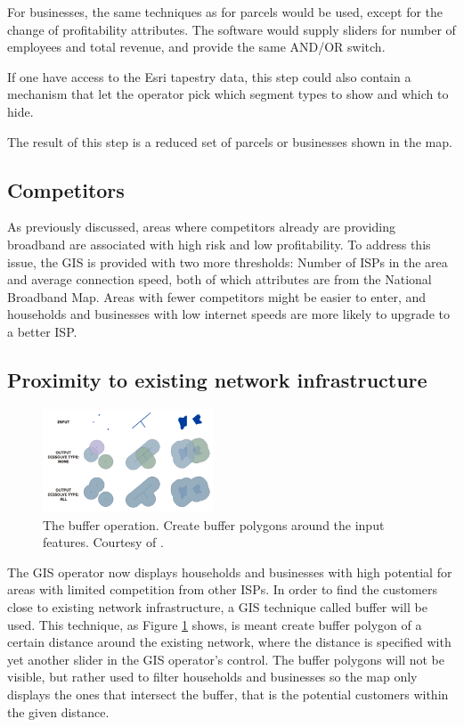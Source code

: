 \documentclass[twocolumn]{article}
\begin{document}
For businesses, the same techniques as for parcels would be used, except for the change of profitability attributes. The software would supply sliders for number of employees and total revenue, and provide the same AND/OR switch.

If one have access to the Esri tapestry data, this step could also contain a mechanism that let the operator pick which segment types to show and which to hide.

The result of this step is a reduced set of parcels or businesses shown in the map.

\subsection{Competitors}
\label{sub:Competitors}
As previously discussed, areas where competitors already are providing broadband are associated with high risk and low profitability. To address this issue, the GIS is provided with two more thresholds: Number of ISPs in the area and average connection speed, both of which attributes are from the National Broadband Map. Areas with fewer competitors might be easier to enter, and households and businesses with low internet speeds are more likely to upgrade to a better ISP.

\subsection{Proximity to existing network infrastructure}
\label{sub:Proximity to existing network infrastructure}
\begin{figure}
  \centering
  \includegraphics[width=0.45\textwidth]{img/buffer.png}
  \caption{The buffer operation. Create buffer polygons around the input features. Courtesy of \cite{noauthor_undated-ar}.}
  \label{fig:buffer}
\end{figure}
The GIS operator now displays households and businesses with high potential for areas with limited competition from other ISPs. In order to find the customers close to existing network infrastructure, a GIS technique called buffer will be used. This technique, as Figure \ref{fig:buffer} shows, is meant create buffer polygon of a certain distance around the existing network, where the distance is specified with yet another slider in the GIS operator's control. The buffer polygons will not be visible, but rather used to filter households and businesses so the map only displays the ones that intersect the buffer, that is the potential customers within the given distance. 
\end{document}
